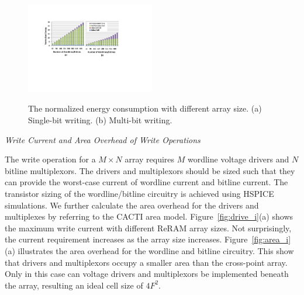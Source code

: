 \begin{figure}%
\centering
  \includegraphics[width=0.5\textwidth]{./figures/energy_f_tall2.pdf}\\
  \caption{The normalized energy consumption with different array size. (a) Single-bit writing. (b) Multi-bit writing.}\label{fig:energy}
    \vspace{-10pt}
\end{figure}

\vspace{6pt} \emph{Write Current and Area Overhead of Write Operations}
\vspace{6pt}

The write operation for a $M \times N$ array requires $M$ wordline voltage
drivers and $N$ bitline multiplexors. The drivers and multiplexors should be sized such that they can provide the worst-case current of wordline
current and bitline current. The transistor sizing of the wordline/bitline
circuitry is achieved using HSPICE simulations. We further calculate the
area overhead for the drivers and multiplexes by referring to the CACTI
area model. Figure~\ref{fig:drive_i}(a) shows the maximum write current
with different ReRAM array sizes. Not surprisingly, the current
requirement increases as the array size increases. Figure~\ref{fig:area_i}(a) illustrates the area overhead for the wordline and bitline circuitry. This show that drivers and multiplexors occupy a smaller area than the cross-point array. Only in this case can voltage drivers and multiplexors be implemented beneath the array, resulting an ideal cell size of $4F^2$.


